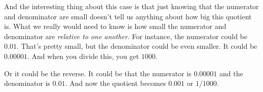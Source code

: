 \documentclass[pdftex, brazil, 12pt, twoside]{article}
\begin{document}
And the interesting thing about this case
is that just knowing that the numerator and denominator are
small doesn't tell us anything about how big this quotient is.
What we really would need to know
is how small the numerator and denominator
are \emph{relative to one another}.
For instance, the numerator could be $0.01$.
That's pretty small, but the denominator
could be even smaller.
It could be $0.00001$.
And when you divide this, you get $1000$.

\begin{figure}[H]
  \begin{center}
  \end{center}
\end{figure}

Or it could be the reverse.
It could be that the numerator is $0.00001$ and the denominator
is $0.01$.
And now the quotient becomes $0.001$ or $1/1000$.

\begin{figure}[H]
  \begin{center}
  \end{center}
\end{figure}
\end{document}
